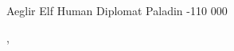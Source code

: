 
\begin{filledCS}%
  {Aeglir}%
  {Elf}%
  {Human Diplomat}%
  {Paladin}%
  {{-1}{1}{0}}%
  {{0}{0}{0}}%
  {%
    \setcounter{Academics}{1}
    \setcounter{Deceit}{1}
    \setcounter{Empathy}{1}

    \setcounter{Melee}{1}
    \partialelvish
  }%
  {\snapcaster, \laststand}%
  {}%

\end{filledCS}

